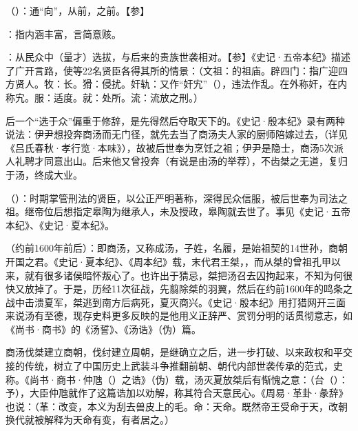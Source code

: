 {
\item {}（）：通“向”，从前，之前。【参】
\item {}：指内涵丰富，言简意赅。
\item {}：从民众中（量才）选拔，与后来的贵族世袭相对。【参】《史记·五帝本纪》描述了广开言路，使等22名贤臣各得其所的情景：（文祖：的祖庙。辟四门：指广迎四方贤人。牧：长。猾：侵扰。奸轨：又作“奸宄”（），违法作乱。在外称奸，在内称宄。服：适度。就：处所。流：流放之刑。）

后一个“选于众”偏重于修辞，是先得然后夺取天下的。《史记·殷本纪》录有两种说法：伊尹想投奔商汤而无门径，就先去当了商汤夫人家的厨师陪嫁过去，（详见《吕氏春秋·孝行览·本味》），故被后世奉为烹饪之祖；伊尹是隐士，商汤5次派人礼聘才同意出山。后来他又曾投奔（有说是由汤的举荐），不齿桀之无道，复归于汤，终成大业。%

\item {}（）：时期掌管刑法的贤臣，以公正严明著称，深得民众信服，被后世奉为司法之祖。继帝位后想指定皋陶为继承人，未及授政，皋陶就去世了。事见《史记·五帝本纪》、《史记·夏本纪》。%

\item {}（约前1600年前后）：即商汤，又称成汤，子姓，名履，是始祖契的14世孙，商朝开国之君。《史记·夏本纪》、《周本纪》载，末代君王桀，，而从桀的曾祖孔甲以来，就有很多诸侯暗怀叛心了。也许出于猜忌，桀把汤召去囚拘起来，不知为何很快又放掉了。于是，历经11次征战，先翦除桀的羽翼，然后在约前1600年的鸣条之战中击溃夏军，桀逃到南方后病死，夏灭商兴。《史记·殷本纪》用打猎网开三面来说汤有至德，现存史料更多反映的是他用义正辞严、赏罚分明的话贯彻意志，如《尚书·商书》的《汤誓》、《汤诰》（伪）篇。

商汤伐桀建立商朝，伐纣建立周朝，是继确立之后，进一步打破、以来政权和平交接的传统，树立了中国历史上武装斗争推翻前朝、朝代内部世袭传承的范式，史称。《尚书·商书·仲虺（）之诰》（伪）载，汤灭夏放桀后有惭愧之意：（台（）：予），大臣仲虺就作了这篇诰加以劝解，称其符合天意民心。《周易·革卦·彖辞》也说：（革：改变，本义为刮去兽皮上的毛。命：天命。既然帝王受命于天，改朝换代就被解释为天命有变，有者居之。）

}
